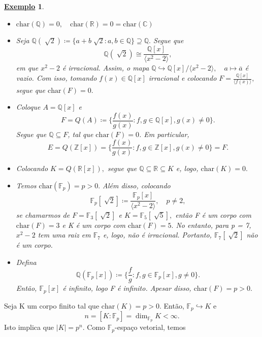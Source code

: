 \documentclass{article}
\newtheorem{example}{\underline{Exemplo}}
\begin{document}
\begin{example}
 \begin{itemize}
  \item[1)] \(\mathrm{char}(\mathbb{Q}) = 0,\quad \mathrm{char}(\mathbb{R})=0 = \mathrm{char}(\mathbb{C})\)
  \item[2)] Seja \(\mathbb{Q}(\sqrt[]{2})\coloneqq \{a + b\sqrt[]{2}: a, b\in \mathbb{Q}\}\supseteq{\mathbb{Q}}.\) Segue que 
  \[
    \mathbb{Q}(\sqrt[]{2})\cong{\frac{\mathbb{Q}[x]}{\langle x^{2}-2 \rangle}},
  \]
em que \(x^{2}-2\) é irracional. Assim, o mapa \(\mathbb{Q}\hookrightarrow \mathbb{Q}[x]/\langle x^{2}-2 \rangle,\quad a\mapsto \overline{a}\) é vazio.
Com isso, tomando \(f(x)\in \mathbb{Q}[x]\) irracional e colocando \(F = \frac{\mathbb{Q}[x]}{\langle f(x) \rangle},\)
segue que \(\mathrm{char}(F) = 0.\)
  \item[3)] Coloque \(A = \mathbb{Q}[x]\) e
  \[
    F = Q(A)\coloneqq \biggl\{\frac{f(x)}{g(x)}: f, g\in \mathbb{Q}[x], g(x)\neq0\biggr\}.
  \]
  Segue que \(\mathbb{Q}\subseteq{F}\), tal que \(\mathrm{char}(F) = 0\). Em particular, 
  \[
    E = Q(\mathbb{Z}[x]) = \biggl\{\frac{f(x)}{g(x)}:f, g\in \mathbb{Z}[x], g(x)\neq0\biggr\} = F.
  \]
  \item[4)] Colocando \(K = Q(\mathbb{R}[x]),\) segue que \(\mathbb{Q} \subseteq{\mathbb{R}}\subseteq{K}\) e, logo, \(\mathrm{char}(K) = 0.\)
  \item[5)] Temos \(\mathrm{char}(\mathbb{F}_{p}) = p > 0.\) Além disso, colocando 
  \[
    \mathbb{F}_{p}[\sqrt[]{2}]\coloneqq \frac{\mathbb{F}_{p}[x]}{\langle x^{2}-2 \rangle},\quad p\neq2,
  \]
se chamarmos de \(F = \mathbb{F}_{3}[\sqrt[]{2}]\) e \(K = \mathbb{F}_{5}[\sqrt[]{5}],\) então
F é um corpo com \(\mathrm{char}(F) = 3\) e K é um corpo com \(\mathrm{char}(F) = 5.\) No entanto, para p = 7,
\(x^{2}-2\) tem uma raiz em \(\mathbb{F}_{7}\) e, logo, não é irracional. Portanto, \(\mathbb{F}_{7}[\sqrt[]{2}]\) não é um
corpo.
  \item[6)] Defina 
  \[
    \mathbb{Q}(\mathbb{F}_{p}[x])\coloneqq \biggl\{\frac{f}{g}: f, g\in \mathbb{F}_{p}[x], g\neq 0\biggr\}.
  \]
  Então, \(\mathbb{F}_{p}[x]\) é infinito, logo F é infinito. Apesar disso, \(\mathrm{char}(F) = p > 0.\)
 \end{itemize}
\end{example}
 Seja K um corpo finito tal que \(\mathrm{char}(K) = p > 0.\) Então, \(\mathbb{F}_{p}\hookrightarrow K\) e 
  \[
    n = [K:\mathbb{F}_{p}] = \dim_{\mathbb{F}_{p}}K < \infty.
  \]
  Isto implica que \(|K| = p^{n}\). Como \(\mathbb{F}_{p}\)-espaço vetorial, temos 
\end{document}
